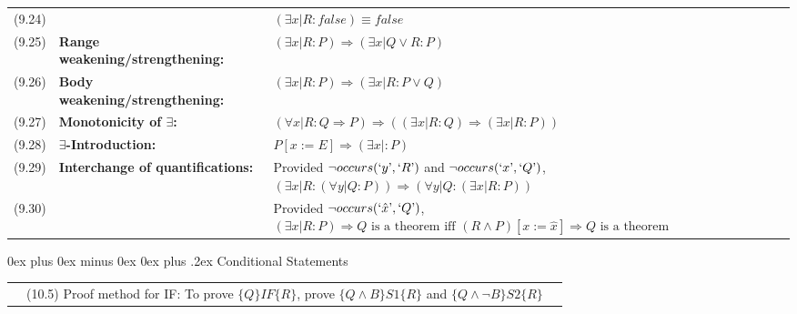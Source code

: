 \documentclass[letterpaper, 8pt]{extarticle}
\makeatletter
\renewcommand{\subsection}{\@startsection{subsection}{2}{0mm}%
                                {0ex plus 0ex minus 0ex}%
                                {0ex plus .2ex}%
                                {\normalfont\small\bfseries}}
\newcommand{\To}{\Rightarrow}
\makeatother
\begin{document}
\begin{multicols*}{3}
\begin{tabulary}{\linewidth}{@{}lLL@{}}
        (9.24) &                                                    & $(\exists x | R : false) \equiv false$                                                                                                                                     \\
        (9.25) & \textbf{Range weakening/strengthening:}            & $(\exists x | R : P) \To (\exists x | Q \lor R : P)$                                                                                                                       \\
        (9.26) & \textbf{Body weakening/strengthening:}             & $(\exists x | R : P) \To (\exists x | R : P \lor Q)$                                                                                                                       \\
        (9.27) & \textbf{Monotonicity of $\exists$:}                & $(\forall x | R : Q \To P) \To ((\exists x | R : Q) \To (\exists x | R : P ))$                                                                                             \\
        (9.28) & \textbf{$\exists$-Introduction:}                   & $P[x := E] \To (\exists x |: P)$                                                                                                                                           \\
        (9.29) & \textbf{Interchange of quantifications:}           & Provided $\neg occurs(`y\textrm', `R\textrm')$ and $\neg occurs(`x\textrm', `Q\textrm')$, $(\exists x | R: (\forall y | Q : P)) \To (\forall y | Q : (\exists x | R : P))$ \\
        (9.30) &                                                    & Provided $\neg occurs(`\hat{x}\textrm', `Q\textrm')$, $(\exists x | R : P) \To Q \text{ is a theorem iff } (R \land P)[x := \hat{x}] \To Q \text{ is a theorem}$           \\
    \end{tabulary}

    \subsection{Conditional Statements}
    \begin{tabulary}{\linewidth}{@{}lLL@{}}

        &(10.5) Proof method for IF: To prove $\{Q\} IF \{R\}$, prove $\{Q \land B\} S1 \{R\}$ and $\{Q \land \neg B\} S2 \{R\}$&
    \end{tabulary}


\end{multicols*}
\end{document}
